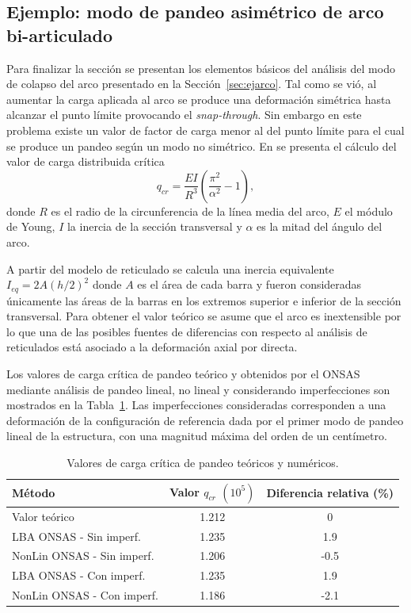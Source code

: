 \subsection{Ejemplo: modo de pandeo asimétrico de arco bi-articulado}

Para finalizar la sección se presentan los elementos básicos del análisis del modo de colapso del arco presentado en la Sección~\ref{sec:ejarco}. %
%
Tal como se vió, al aumentar la carga aplicada al arco se produce una deformación simétrica hasta alcanzar el punto límite provocando el \textit{snap-through}. %
%
Sin embargo en este problema existe un valor de factor de carga menor al del punto límite para el cual se produce un pandeo según un modo no simétrico. %
En \citep{timoshenko2012theory} se presenta el cálculo del valor de carga distribuida crítica
%
\begin{equation}
q_{cr} = \frac{E I}{R^3} \left( \frac{\pi^2}{\alpha^2} -1\right),
\end{equation}
%
donde $R$ es el radio de la circunferencia de la línea media del arco, $E$ el módulo de Young, $I$ la inercia de la sección transversal y $\alpha$ es la mitad del ángulo del arco.
%

A partir del modelo de reticulado se calcula una inercia equivalente $I_{eq}= 2 A (h/2)^2$ donde $A$ es el área de cada barra y fueron consideradas únicamente las áreas de la barras en los extremos superior e inferior de la sección transversal. %
%
Para obtener el valor teórico se asume que el arco es inextensible por lo que una de las posibles fuentes de diferencias con respecto al análisis de reticulados está asociado a la deformación axial por directa.

Los valores de carga crítica de pandeo teórico y obtenidos por el ONSAS mediante análisis de pandeo lineal, no lineal y considerando imperfecciones son mostrados en la Tabla~\ref{tab:pand}. %
%
Las imperfecciones consideradas corresponden a una deformación de la configuración de referencia dada por el primer modo de pandeo lineal de la estructura, con una magnitud máxima del orden de un centímetro.
%
\begin{table}[htb]
	\centering
	\begin{tabular}{l|cc}
		\hline
		Método & Valor $q_{cr}$ $(10^5)$ & Diferencia relativa (\%) \\
		\hline
		\hline
		Valor teórico & 1.212 & 0 \\
		\hline
		LBA ONSAS - Sin imperf. & 1.235 &  1.9 \\
		NonLin ONSAS  - Sin imperf. & 1.206  & -0.5 \\
		\hline
		LBA ONSAS  - Con imperf.& 1.235 & 1.9 \\
		NonLin ONSAS - Con imperf.& 1.186 & -2.1\\
		\hline
	\end{tabular}
	\caption{Valores de carga crítica de pandeo teóricos y numéricos.}
	\label{tab:pand}
\end{table}

